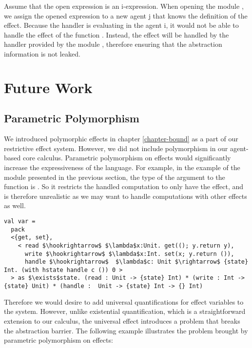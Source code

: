 Assume that the open expression is an i-expression. When opening the module , we assign the opened expression  to a new agent j that  knows the definition of the  effect. Because the  handler is evaluating in the agent i, it would not be able to handle the effect  of the function . Instead, the  effect will be handled by the handler provided by the module , therefore ensuring that the abstraction information is not leaked.


\section{Future Work}

\subsection{Parametric Polymorphism}

We introduced polymorphic effects in chapter \ref{chapter-bound} as a part of our restrictive effect system. However, we did not include  polymorphism in our agent-based core calculus. Parametric polymorphism on effects would significantly increase the expressiveness of the language. For example, in the example of the  module presented in the previous section, the type of the argument to the  function is . So it restricts the handled computation to only have the  effect, and is therefore unrealistic as we may want to handle computations with other effects as well. 
\begin{lstlisting}[mathescape=true]
val var = 
  pack 
  <{get, set}, 
    < read $\hookrightarrow$ $\lambda$x:Unit. get((); y.return y),
      write $\hookrightarrow$ $\lambda$x:Int. set(x; y.return ()),
      handle $\hookrightarrow$  $\lambda$c: Unit $\rightarrow$ {state} Int. (with hstate handle c ()) 0 >
  > as $\exists$state. (read : Unit -> {state} Int) * (write : Int -> {state} Unit) * (handle :  Unit -> {state} Int -> {} Int)
\end{lstlisting} 

Therefore we would desire to add universal quantifications for effect variables to the system. However, unlike existential quantification, which is a straightforward extension to our calculus, the universal effect introduces a problem that breaks the abstraction barrier. The following example illustrates the problem brought by parametric polymorphism on effects:

